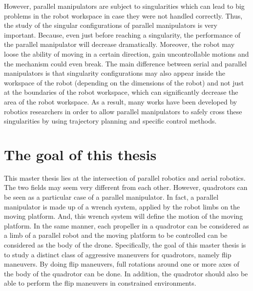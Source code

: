 \documentclass{thesisreport}
\begin{document}


\pagebreak

However, parallel manipulators are subject to singularities which can lead to big problems in the robot workspace in case they were not handled correctly. Thus, the study of the singular configurations of parallel manipulators is very important. Because, even just before reaching a singularity, the performance of the parallel manipulator will decrease dramatically. Moreover, the robot may loose the ability of moving in a certain direction, gain uncontrollable motions and the mechanism could even break. The main difference between serial and parallel manipulators is that singularity configurations may also appear inside the workspace of the robot (depending on the dimensions of the robot) and not just at the boundaries of the robot workspace, which can significantly decrease the area of the robot workspace.
As a result, many works have been developed by robotics researchers in order to allow parallel manipulators to safely cross these singularities by using trajectory planning and specific control methods.

\section*{The goal of this thesis}

This master thesis lies at the intersection of parallel robotics and aerial robotics. The two fields may seem very different from each other. However, quadrotors can be seen as a particular case of a parallel manipulator. 
In fact, a parallel manipulator is made up of a wrench system, applied by the robot limbs on the moving platform. And, this wrench system will define the motion of the moving platform. In the same manner, each propeller in a quadrotor can be considered as a limb of a parallel robot and the moving platform to be controlled can be considered as the body of the drone. 
Specifically, the goal of this master thesis is to study a distinct class of aggressive maneuvers for quadrotors, namely flip maneuvers. By doing flip maneuvers, full rotations around one or more axes of the body of the quadrotor can be done. In addition, the quadrotor should also be able to perform the flip maneuvers in constrained environments.
\end{document}

